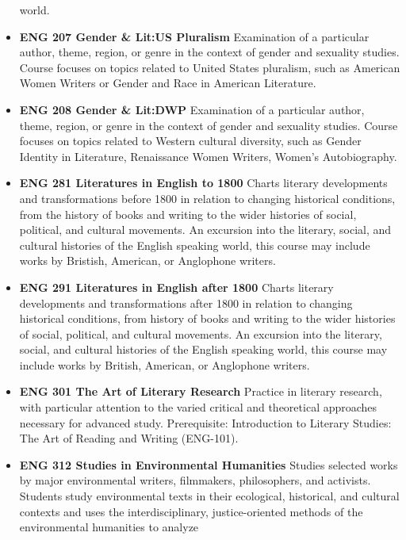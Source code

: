 \documentclass[
  letterpaper,
]{scrbook}
\begin{document}
\begin{itemize}
  world.\\
\item
  \textbf{ENG 207 Gender \& Lit:US Pluralism} Examination of a
  particular author, theme, region, or genre in the context of gender
  and sexuality studies. Course focuses on topics related to United
  States pluralism, such as American Women Writers or Gender and Race in
  American Literature.\\
\item
  \textbf{ENG 208 Gender \& Lit:DWP} Examination of a particular author,
  theme, region, or genre in the context of gender and sexuality
  studies. Course focuses on topics related to Western cultural
  diversity, such as Gender Identity in Literature, Renaissance Women
  Writers, Women's Autobiography.\\
\item
  \textbf{ENG 281 Literatures in English to 1800} Charts literary
  developments and transformations before 1800 in relation to changing
  historical conditions, from the history of books and writing to the
  wider histories of social, political, and cultural movements. An
  excursion into the literary, social, and cultural histories of the
  English speaking world, this course may include works by Bristish,
  American, or Anglophone writers.\\
\item
  \textbf{ENG 291 Literatures in English after 1800} Charts literary
  developments and transformations after 1800 in relation to changing
  historical conditions, from history of books and writing to the wider
  histories of social, political, and cultural movements. An excursion
  into the literary, social, and cultural histories of the English
  speaking world, this course may include works by British, American, or
  Anglophone writers.\\
\item
  \textbf{ENG 301 The Art of Literary Research} Practice in literary
  research, with particular attention to the varied critical and
  theoretical approaches necessary for advanced study. Prerequisite:
  Introduction to Literary Studies: The Art of Reading and Writing
  (ENG-101).\\
\item
  \textbf{ENG 312 Studies in Environmental Humanities} Studies selected
  works by major environmental writers, filmmakers, philosophers, and
  activists. Students study environmental texts in their ecological,
  historical, and cultural contexts and uses the interdisciplinary,
  justice-oriented methods of the environmental humanities to analyze

\end{itemize}
\end{document}
